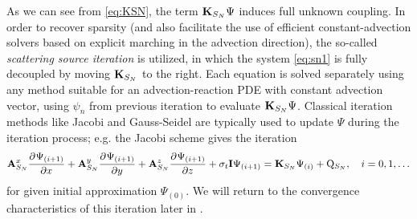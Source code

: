 As we can see from \eqref{eq:KSN}, the term $\mathbf{K}_{S_N}\Psi$ induces full unknown coupling. In order to recover 
sparsity (and also facilitate the use of efficient constant-advection solvers based on explicit marching in the advection direction), the so-called  \textit{scattering
source iteration} is utilized, in which the system \eqref{eq:sn1} is fully
decoupled by moving $\mathbf{K}_{S_N}$ to the right. Each equation is solved separately using any method suitable for an advection-reaction PDE with constant
advection vector, using $\psi_n$ from previous iteration to evaluate $\mathbf{K}_{S_N}\Psi$. Classical iteration methods
like Jacobi and Gauss-Seidel are typically used to update $\Psi$ during the iteration process; e.g. the Jacobi scheme 
gives the iteration
\begin{equation}\label{eq:SI}
	\mathbf{A}_{S_N}^x\frac{\partial^{}\Psi_{(i+1)}}{\partial x^{}} + \mathbf{A}_{S_N}^y\frac{\partial^{}\Psi_{(i+1)}}{\partial y^{}} +
	\mathbf{A}_{S_N}^z\frac{\partial^{}\Psi_{(i+1)}}{\partial z^{}} + \sigma_t\mathbf{I}\Psi_{(i+1)}= \mathbf{K}_{S_N}\Psi_{(i)} +
	\mathrm{Q}_{S_N},\quad
	i = 0,1,\ldots
\end{equation}
for given initial approximation $\Psi_{(0)}$. We will return to the convergence characteristics of this iteration later
in .

